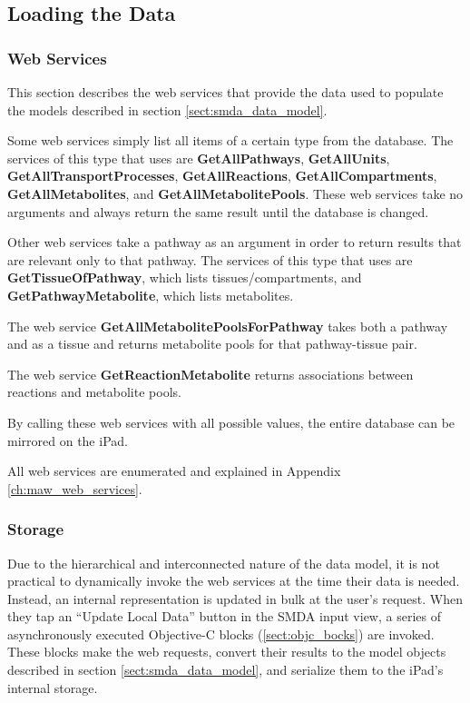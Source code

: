 \subsection{Loading the Data}
\label{sect:smda_all_data}

\subsubsection{Web Services}
\label{sect:smda_web_services}

This section describes the web services that provide the data used to populate
the models described in section \ref{sect:smda_data_model}.

Some web services simply list all items of a certain type from the database. The
services of this type that \mawapp uses are \textbf{GetAllPathways},
\textbf{GetAllUnits}, \textbf{GetAllTransportProcesses},
\textbf{GetAllReactions}, \textbf{GetAllCompartments},
\textbf{GetAllMetabolites}, and \textbf{GetAllMetabolitePools}. These web
services take no arguments and always return the same result until the database
is changed.

Other web services take a pathway as an argument in order to return results that
are relevant only to that pathway. The services of this type that \mawapp uses
are \textbf{GetTissueOfPathway}, which lists tissues/compartments, and
\textbf{GetPathwayMetabolite}, which lists metabolites.

The web service \textbf{GetAllMetabolitePoolsForPathway} takes both a pathway
and as a tissue and returns metabolite pools for that pathway-tissue pair.

The web service \textbf{GetReactionMetabolite} returns associations between
reactions and metabolite pools.

By calling these web services with all possible values, the entire database can
be mirrored on the iPad.

All \pathcasemaw web services are enumerated and explained in Appendix
\ref{ch:maw_web_services}.

\subsubsection{Storage}

Due to the hierarchical and interconnected nature of the data model, it is not
practical to dynamically invoke the web services at the time their data is
needed. Instead, an internal representation is updated in bulk at the user's
request. When they tap an ``Update Local Data'' button in the SMDA input view, a
series of asynchronously executed Objective-C blocks (\ref{sect:objc_bocks}) are
invoked. These blocks make the web requests, convert their results to the model
objects described in section \ref{sect:smda_data_model}, and serialize them to
the iPad's internal storage.

